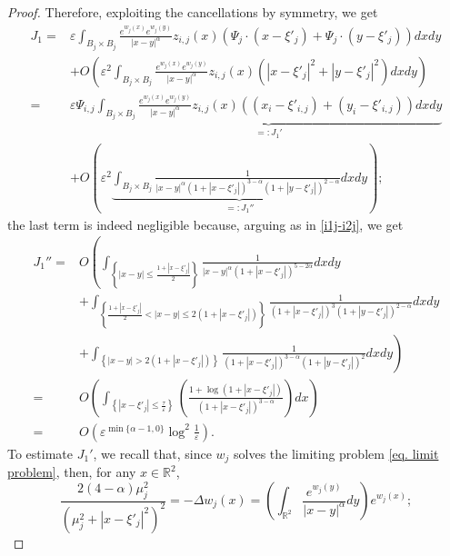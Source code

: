 \documentclass[11pt]{article}
\begin{document}
\begin{proof}
Therefore, exploiting the cancellations by symmetry, we get
\begin{align*}
J_1=&\varepsilon\int_{B_j\times B_j}\frac{e^{w_j(x)}e^{w_j(y)}}{|x-y|^\alpha}z_{i,j}(x)\left(\Psi_j\cdot\left(x-\xi'_j\right)+\Psi_j\cdot\left(y-\xi'_j\right)\right)dxdy\\
&+O\left(\varepsilon^2\int_{B_j\times B_j}\frac{e^{w_j(x)}e^{w_j(y)}}{|x-y|^\alpha}z_{i,j}(x)\left(\left|x-\xi'_j\right|^2+\left|y-\xi'_j\right|^2\right)dxdy\right)\\
=&\varepsilon\Psi_{i,j}\underbrace{\int_{B_j\times B_j}\frac{e^{w_j(x)}e^{w_j(y)}}{|x-y|^\alpha}z_{i,j}(x)\left(\left(x_i-\xi'_{i,j}\right)+\left(y_i-\xi'_{i,j}\right)\right)dxdy}_{=:J_1'}\\
&+O\left(\varepsilon^2\underbrace{\int_{B_j\times B_j}\frac1{|x-y|^\alpha\left(1+\left|x-\xi'_j\right|\right)^{3-\alpha}\left(1+\left|y-\xi'_j\right|\right)^{2-\alpha}}dxdy}_{=:J_1''}\right);
\end{align*}
the last term is indeed negligible because, arguing as in \eqref{i1j-i2j}, we get
\begin{align*}
J_1''=&O\left(\int_{\left\{|x-y|\le\frac{1+\left|x-\xi'_j\right|}2\right\}}\frac1{|x-y|^\alpha\left(1+\left|x-\xi'_j\right|\right)^{5-2\alpha}}dxdy\right.\\
&\left.+\int_{\left\{\frac{1+\left|x-\xi'_j\right|}2<|x-y|\le2\left(1+\left|x-\xi'_j\right|\right)\right\}}\frac1{\left(1+\left|x-\xi'_j\right|\right)^3\left(1+\left|y-\xi'_j\right|\right)^{2-\alpha}}dxdy\right.\\
&\left.+\int_{\left\{|x-y|>2\left(1+\left|x-\xi'_j\right|\right)\right\}}\frac1{\left(1+\left|x-\xi'_j\right|\right)^{3-\alpha}\left(1+\left|y-\xi'_j\right|\right)^2}dxdy\right)\\
=&O\left(\int_{\left\{\left|x-\xi'_j\right|\le\frac\tau\varepsilon\right\}}\left(\frac{1+\log\left(1+\left|x-\xi'_j\right|\right)}{\left(1+\left|x-\xi'_j\right|\right)^{3-\alpha}}\right)dx\right)\\
=&O\left(\varepsilon^{\min\{\alpha-1,0\}}\log^2\frac1\varepsilon\right).
\end{align*}
To estimate $J_1'$, we recall that, since $w_j$ solves the limiting problem \eqref{eq. limit problem}, then, for any $x\in\mathbb R^2$,
\begin{equation}\label{eqbubble}
\frac{2(4-\alpha)\mu_j^2}{\left(\mu_j^2+\left|x-\xi'_j\right|^2\right)^2}=-\Delta w_j(x)=\left(\int_{\mathbb R^2}\frac{e^{w_j(y)}}{|x-y|^\alpha}dy\right)e^{w_j(x)};
\end{equation}

\end{proof}
\end{document}
